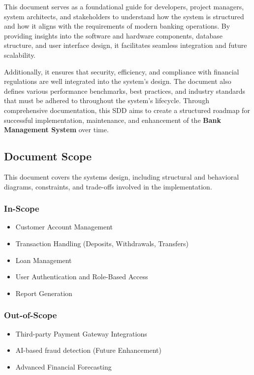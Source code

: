 This document serves as a foundational guide for developers, project
managers, system architects, and stakeholders to understand how the
system is structured and how it aligns with the requirements of modern
banking operations. By providing insights into the software and hardware
components, database structure, and user interface design, it
facilitates seamless integration and future scalability.

Additionally, it ensures that security, efficiency, and compliance with
financial regulations are well integrated into the system's design. The
document also defines various performance benchmarks, best practices,
and industry standards that must be adhered to throughout the system's
lifecycle. Through comprehensive documentation, this SDD aims to create
a structured roadmap for successful implementation, maintenance, and
enhancement of the \textbf{Bank Management System} over time.

\subsection{Document Scope}\label{document-scope}

This document covers the systems design, including structural and
behavioral diagrams, constraints, and trade-offs involved in the
implementation.

\subsubsection{In-Scope}\label{in-scope}

\begin{itemize}
\item
  Customer Account Management
\item
  Transaction Handling (Deposits, Withdrawals, Transfers)
\item
  Loan Management
\item
  User Authentication and Role-Based Access
\item
  Report Generation
\end{itemize}

\subsubsection{Out-of-Scope}\label{out-of-scope}

\begin{itemize}
\item
  Third-party Payment Gateway Integrations
\item
  AI-based fraud detection (Future Enhancement)
\item
  Advanced Financial Forecasting
\end{itemize}

